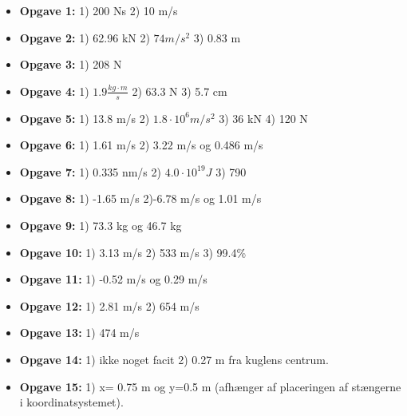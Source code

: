 \documentclass[a4paper, 12pt]{article}
\begin{document}
\begin{itemize}
\item \textbf{Opgave 1:} 1) 200 Ns 2) 10 m/s
\item \textbf{Opgave 2:} 1) 62.96 kN 2) \(74 m/s^2\) 3) 0.83 m
\item \textbf{Opgave 3:} 1) 208 N
\item \textbf{Opgave 4:} 1) \(1.9 \frac{kg \cdot m}{s}\) 2) 63.3 N 3) 5.7 cm
\item \textbf{Opgave 5:} 1) 13.8 m/s 2) \(1.8 \cdot 10^6 m/s^2\) 3) 36 kN 4) 120 N
\item \textbf{Opgave 6:} 1) 1.61 m/s 2) 3.22 m/s og 0.486 m/s
\item \textbf{Opgave 7:} 1) 0.335 nm/s 2) \(4.0\cdot 10^{19} J\) 3) 790
\item \textbf{Opgave 8:} 1) -1.65 m/s 2)-6.78 m/s og 1.01 m/s
\item \textbf{Opgave 9:} 1) 73.3 kg og 46.7 kg
\item \textbf{Opgave 10:} 1) 3.13 m/s 2) 533 m/s 3) 99.4\%
\item \textbf{Opgave 11:} 1) -0.52 m/s og 0.29 m/s
\item \textbf{Opgave 12:} 1) 2.81 m/s 2) 654 m/s
\item \textbf{Opgave 13:} 1) 474 m/s
\item \textbf{Opgave 14:} 1) ikke noget facit 2) 0.27 m fra kuglens centrum.
\item \textbf{Opgave 15:} 1) x= 0.75 m og y=0.5 m (afhænger af placeringen af stængerne i koordinatsystemet).
\end{itemize}
\end{document}
